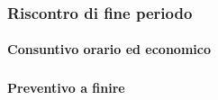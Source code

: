 \subsubsection{Riscontro di fine periodo}


\paragraph{Consuntivo orario ed economico}
\subparagraph*{}


\paragraph{Preventivo a finire}
\subparagraph*{}

\pafTable{
	
}
